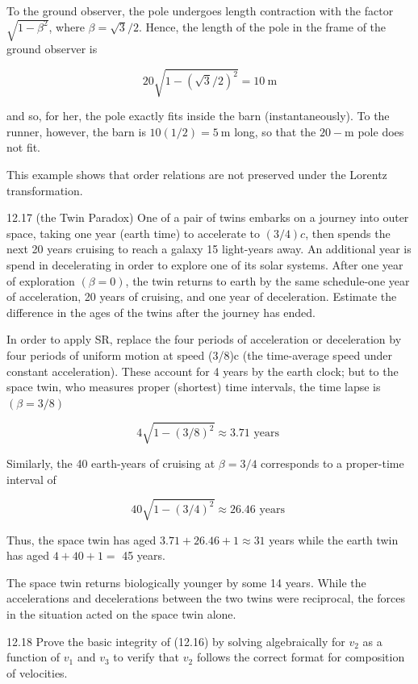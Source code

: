 \documentclass[10pt]{article}
\begin{document}
To the ground observer, the pole undergoes length contraction with the factor $\sqrt{1-\beta^{2}}$, where $\beta=\sqrt{3} / 2$. Hence, the length of the pole in the frame of the ground observer is

$$
20 \sqrt{1-(\sqrt{3} / 2)^{2}}=10 \mathrm{~m}
$$

and so, for her, the pole exactly fits inside the barn (instantaneously). To the runner, however, the barn is $10(1 / 2)=5 \mathrm{~m}$ long, so that the $20-\mathrm{m}$ pole does not fit.

This example shows that order relations are not preserved under the Lorentz transformation.

12.17 (the Twin Paradox) One of a pair of twins embarks on a journey into outer space, taking one year (earth time) to accelerate to $(3 / 4) c$, then spends the next 20 years cruising to reach a galaxy 15 light-years away. An additional year is spend in decelerating in order to explore one of its solar systems. After one year of exploration $(\beta=0)$, the twin returns to earth by the same schedule-one year of acceleration, 20 years of cruising, and one year of deceleration. Estimate the difference in the ages of the twins after the journey has ended.

In order to apply SR, replace the four periods of acceleration or deceleration by four periods of uniform motion at speed (3/8)c (the time-average speed under constant acceleration). These account for 4 years by the earth clock; but to the space twin, who measures proper (shortest) time intervals, the time lapse is $(\beta=3 / 8)$

$$
4 \sqrt{1-(3 / 8)^{2}} \approx 3.71 \text { years }
$$

Similarly, the 40 earth-years of cruising at $\beta=3 / 4$ corresponds to a proper-time interval of

$$
40 \sqrt{1-(3 / 4)^{2}} \approx 26.46 \text { years }
$$

Thus, the space twin has aged $3.71+26.46+1 \approx 31$ years while the earth twin has aged $4+40+1=$ 45 years.

The space twin returns biologically younger by some 14 years. While the accelerations and decelerations between the two twins were reciprocal, the forces in the situation acted on the space twin alone.

12.18 Prove the basic integrity of (12.16) by solving algebraically for $v_{2}$ as a function of $v_{1}$ and $v_{3}$ to verify that $v_{2}$ follows the correct format for composition of velocities.
\end{document}
